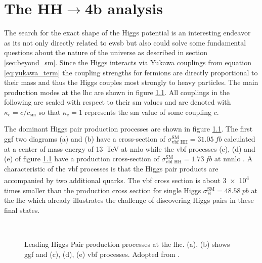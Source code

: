 \chapter{The HH$\rightarrow$4b analysis}

The search for the exact shape of the Higgs potential is an interesting endeavor as its not only  directly related to \ac{ewsb} but also could solve some fundamental questions about the nature of the universe as described in section \ref{sec:beyond_sm}. Since the Higgs interacts via Yukawa couplings from equation \ref{eq:yukawa_term} the coupling strengths for fermions are directly proportional to their mass and thus the Higgs couples most strongly to heavy particles. The main production modes at the \ac{lhc} are shown in figure \ref{fig:main_production_processes}. All couplings in the following are scaled with respect to their \ac{sm} values and are denoted with $\kappa_\mathrm{c} = c/c_\mathrm{sm}$ so that $\kappa_\mathrm{c}=1$ represents the \ac{sm} value of some coupling $c$.

The dominant Higgs pair production processes are shown in figure \ref{fig:main_production_processes}. The first \ac{ggf} two diagrams (a) and (b) have a cross-section of
$\sigma_\text{vbf HH}^\text{SM}=\qty[]{31.05}{fb}$ calculated at a center of mass energy of \qty[]{13}{TeV} at \ac{nnlo} \citep{Grazzini_2018} while the \ac{vbf} processes (c), (d) and (e) of figure \ref{fig:main_production_processes} have a production cross-section of
$\sigma_\text{vbf HH}^\text{SM}=\qty[]{1.73}{fb}$ at \ac{nnnlo} \citep{PhysRevD.98.114016}. A characteristic of the \ac{vbf} processes is that the Higgs pair products are accompanied by two additional quarks. The \ac{vbf} cross section is about \qty[]{3e4}{} times smaller than the production cross section for single Higgs $\sigma_\text{H}^\text{SM}=\qty[]{48.58}{pb}$ at the \ac{lhc} \citep{de2016arxiv} which already illustrates the challenge of discovering Higgs pairs in these final states.
\begin{figure}
    \centering
    \hspace{.06\textwidth}
     \\
    \hspace{.01\textwidth}
    \hspace{.01\textwidth}
    \caption[]{Leading Higgs Pair production processes at the \ac{lhc}. (a), (b) shows \ac{ggf} and (c), (d), (e) \ac{vbf} processes. Adopted from \citep{aad2023search}.}
    \label{fig:main_production_processes}
\end{figure}


